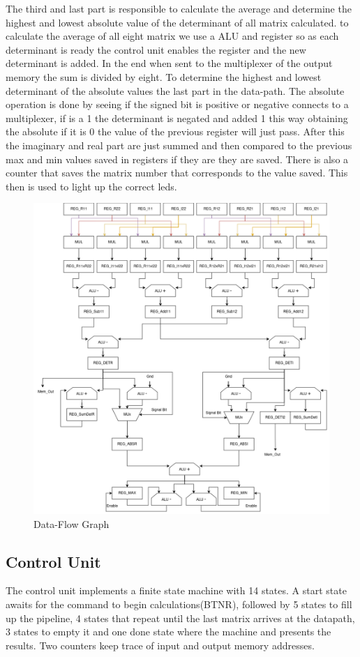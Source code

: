 \documentclass[12pt]{article}
\begin{document}
The third and last part is responsible to calculate the average and determine the highest and lowest absolute value of the determinant of all matrix calculated. to calculate the average of all eight matrix we use a ALU and register so as each determinant is ready the control unit enables the register and the new determinant is added. In the end when sent to the multiplexer of the output memory the sum is divided by eight. To determine the highest and lowest determinant of the absolute values the last part in the data-path. The absolute operation is done by seeing if the signed bit is positive or negative connects to a multiplexer, if is a 1 the determinant is negated and added 1 this way obtaining the absolute if it is 0 the value of the previous register will just pass. After this the imaginary and real part are just summed and then compared to the previous max and min values saved in registers if they are they are saved. There is also a counter that saves the matrix number that corresponds to the value saved. This then is used to light up the correct leds. 
\begin{figure}[H]
	\centering
	\includegraphics[width=0.75\linewidth]{images/DataPath.png}
	\caption{Data-Flow Graph}
	\label{fig:datapath}
\end{figure}


\subsection{Control Unit}
The control unit implements a finite state machine with 14 states. A start state awaits for the command to begin calculations(BTNR), followed by 5 states to fill up the pipeline, 4 states that repeat until the last matrix arrives at the datapath, 3 states to empty it and one done state where the machine and presents the results.
Two counters keep trace of input and output memory addresses.
\end{document}
